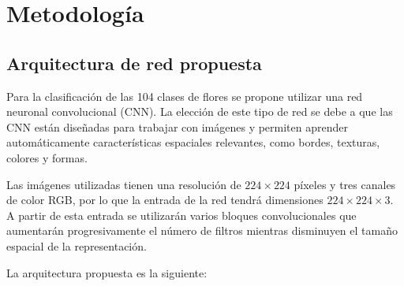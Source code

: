 \section{Metodología}

\subsection{Arquitectura de red propuesta}

Para la clasificación de las 104 clases de flores se propone utilizar una red neuronal convolucional (CNN). La elección de este tipo de red se debe a que las CNN están diseñadas para trabajar con imágenes y permiten aprender automáticamente características espaciales relevantes, como bordes, texturas, colores y formas.

Las imágenes utilizadas tienen una resolución de $224 \times 224$ píxeles y tres canales de color RGB, por lo que la entrada de la red tendrá dimensiones $224 \times 224 \times 3$. A partir de esta entrada se utilizarán varios bloques convolucionales que aumentarán progresivamente el número de filtros mientras disminuyen el tamaño espacial de la representación.

La arquitectura propuesta es la siguiente:

